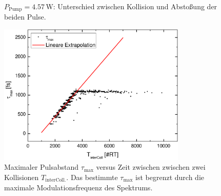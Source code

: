\documentclass[bachelor,       %
               twoside,        %
               BCOR10mm,       %
               english,ngerman, %
               ]{GAUBM}
\begin{document}
\begin{figure}[!htb]
   \hfill
   \caption{$P_\text{Pump}=4.57\,$W: Unterschied zwischen Kollision und Abstoßung der beiden Pulse.}
   \label{fig:rbf457}
 \end{figure}

\begin{figure}[!htb]
	\centering
	\includegraphics[width=0.8\textwidth]{figures/bounceDistTime}
	\caption{Maximaler Pulsabstand $\tau_\text{max}$ versus Zeit zwischen zwischen zwei Kollisionen $T_\text{interColl.}$. Das bestimmte $\tau_\text{max}$ ist begrenzt durch die maximale Modulationsfrequenz des Spektrums.}
	\label{fig:bounceDistTime}
\end{figure}
\end{document}
